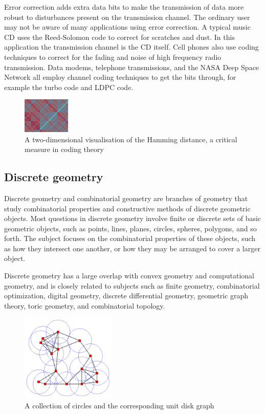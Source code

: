 \documentclass{article}
\begin{document}
Error correction adds extra data bits to make the transmission of data more robust to disturbances present on the transmission channel. The ordinary user may not be aware of many applications using error correction. A typical music CD uses the Reed-Solomon code to correct for scratches and dust. In this application the transmission channel is the CD itself. Cell phones also use coding techniques to correct for the fading and noise of high frequency radio transmission. Data modems, telephone transmissions, and the NASA Deep Space Network all employ channel coding techniques to get the bits through, for example the turbo code and LDPC code.
\begin{figure}[h]
\includegraphics[width=0.2\textwidth]{sk.jpg}
\caption{A two-dimensional visualisation of the Hamming distance, a critical measure in coding theory}
\end{figure} 
\subsection{Discrete geometry}
Discrete geometry and combinatorial geometry are branches of geometry that study combinatorial properties and constructive methods of discrete geometric objects. Most questions in discrete geometry involve finite or discrete sets of basic geometric objects, such as points, lines, planes, circles, spheres, polygons, and so forth. The subject focuses on the combinatorial properties of these objects, such as how they intersect one another, or how they may be arranged to cover a larger object.

Discrete geometry has a large overlap with convex geometry and computational geometry, and is closely related to subjects such as finite geometry, combinatorial optimization, digital geometry, discrete differential geometry, geometric graph theory, toric geometry, and combinatorial topology. 
\begin{figure}[h]
\includegraphics[width=0.4\textwidth]{sl.png}
\caption{A collection of circles and the corresponding unit disk graph}
\end{figure}
\end{document}
